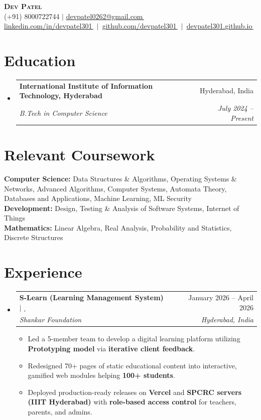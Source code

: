\documentclass[letterpaper,11pt]{article}
\makeatletter
\newcommand{\resumeItem}[1]{
  \item \small #1\vspace{-3pt}
}
\newcommand{\resumeSubheading}[4]{
  \vspace{-2pt}\item
    \begin{tabular*}{0.97\textwidth}[t]{l@{\extracolsep{\fill}}r}
      \textbf{#1} & #2 \\
      \textit{\small#3} & \textit{\small #4} \\
    \end{tabular*}\vspace{-7pt}
}
\newcommand{\extlinkicon}{\,\raisebox{0.05ex}{\footnotesize\faExternalLinkSquare}}
\newcommand{\resumeSubHeadingListStart}{\begin{itemize}[leftmargin=0.15in, label={}]}
\newcommand{\resumeSubHeadingListEnd}{\end{itemize}}
\newcommand{\resumeItemListStart}{\begin{itemize}}
\newcommand{\resumeItemListEnd}{\end{itemize}\vspace{-5pt}}
\makeatother
\begin{document}
\begin{center}
    \textbf{\Huge \scshape Dev Patel} \\ \vspace{1pt}
    \small (+91) 8000722744 $|$ \href{mailto:devpatel0262@gmail.com}{\underline{devpatel0262@gmail.com}\extlinkicon} \\
    \small \mbox{\href{https://linkedin.com/in/devpatel301}{\underline{linkedin.com/in/devpatel301}\extlinkicon} $|$ \href{https://github.com/devpatel301}{\underline{github.com/devpatel301}\extlinkicon} $|$ \href{https://devpatel301.github.io}{\underline{devpatel301.github.io}\extlinkicon}}
\end{center}

\section{Education}
\resumeSubHeadingListStart
\resumeSubheading
{International Institute of Information Technology, Hyderabad}{Hyderabad, India}
{B.Tech in Computer Science}{July 2024 -- Present}
\resumeSubHeadingListEnd

\section{Relevant Coursework}
\small{
    \textbf{Computer Science:} Data Structures \& Algorithms, Operating Systems \& Networks, Advanced Algorithms, Computer Systems, Automata Theory, Databases and Applications, Machine Learning, ML Security \\
    \textbf{Development:} Design, Testing \& Analysis of Software Systems, Internet of Things \\
    \textbf{Mathematics:} Linear Algebra, Real Analysis, Probability and Statistics, Discrete Structures
}

\section{Experience}
\resumeSubHeadingListStart

\resumeSubheading
{S-Learn (Learning Management System) $|$ \href{https://github.com/aryamirani/dass_shankar/}{\extlinkicon}}{January 2026 -- April 2026}
{Shankar Foundation}{Hyderabad, India}
\resumeItemListStart
\resumeItem{Led a 5-member team to develop a digital learning platform utilizing \textbf{Prototyping model} via \textbf{iterative client feedback}.}
\resumeItem{Redesigned 70+ pages of static educational content into interactive, gamified web modules helping \textbf{100+ students}.}
\resumeItem{Deployed production-ready releases on \textbf{Vercel} and \textbf{SPCRC servers (IIIT Hyderabad)} with \textbf{role-based access control} for teachers, parents, and admins.}
\resumeItemListEnd
\resumeSubHeadingListEnd
\end{document}
